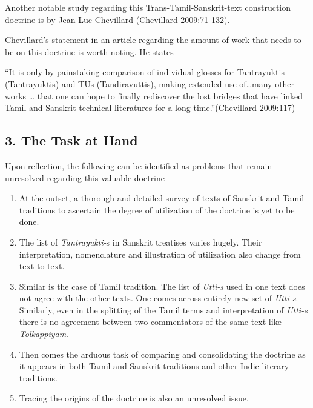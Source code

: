 Another notable study regarding this Trans-Tamil-Sanskrit-text construction doctrine is by Jean-Luc Chevillard (Chevillard 2009:71-132).

Chevillard’s statement in an article regarding the amount of work that needs to be on this doctrine is worth noting. He states –

\begin{myquote}
“It is only by painstaking comparison of individual glosses for Tantrayuktis (Tantrayuktis) and TUs (Tandiravuttis), making extended use of…many other works … that one can hope to finally rediscover the lost bridges that have linked Tamil and Sanskrit technical literatures for a long time.”\hfill (Chevillard 2009:117)
\end{myquote}


\subsection*{3. The Task at Hand}

Upon reflection, the following can be identified as problems that remain unresolved regarding this valuable doctrine –

\begin{enumerate}
\item At the outset, a thorough and detailed survey of texts of Sanskrit and Tamil traditions to ascertain the degree of utilization of the doctrine is yet to be done.

 \item The list of \textit{Tantrayukti-}s in Sanskrit treatises varies hugely. Their interpretation, nomenclature and illustration of utilization also change from text to text.

 \item Similar is the case of Tamil tradition. The list of \textit{Utti-s} used in one text does not agree with the other texts. One comes across entirely new set of \textit{Utti-s}. Similarly, even in the splitting of the Tamil terms and interpretation of \textit{Utti-s} there is no agreement between two commentators of the same text like \textit{Tolkāppiyam}.

 \item Then comes the arduous task of comparing and consolidating the doctrine as it appears in both Tamil and Sanskrit traditions and other Indic literary traditions.

 \item Tracing the origins of the doctrine is also an unresolved issue.

\end{enumerate}


